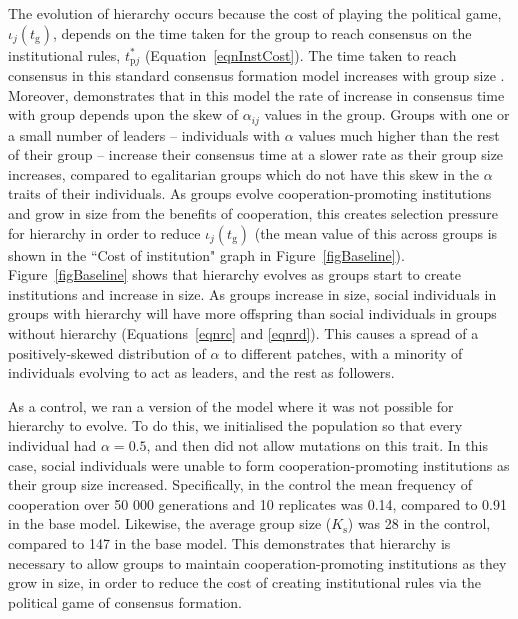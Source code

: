 \documentclass{rstb}
\begin{document}
\begin{linenumbers}
 The evolution of hierarchy occurs because the cost of playing the political game, $\iota_j(t_\mathrm{g})$, depends on the time taken for the group to reach consensus on the institutional rules, $t_{\mathrm{p}j}^*$ (Equation~\ref{eqnInstCost}). The time taken to reach consensus in this standard consensus formation model increases with group size \cite{Perret:2020:a}. Moreover, \cite{Perret:2020:a} demonstrates that in this model the rate of increase in consensus time with group depends upon the skew of $\alpha_{ij}$ values in the group. Groups with one or a small number of leaders -- individuals with $\alpha$ values much higher than the rest of their group -- increase their consensus time at a slower rate as their group size increases, compared to egalitarian groups which do not have this skew in the $\alpha$ traits of their individuals. As groups evolve cooperation-promoting institutions and grow in size from the benefits of cooperation, this creates selection pressure for hierarchy in order to reduce $\iota_j(t_\mathrm{g})$ (the mean value of this across groups is shown in the ``Cost of institution" graph in Figure~\ref{figBaseline}). Figure~\ref{figBaseline} shows that hierarchy evolves as groups start to create institutions and increase in size. As groups increase in size, social individuals in groups with hierarchy will have more offspring than social individuals in groups without hierarchy (Equations~\ref{eqnrc} and \ref{eqnrd}). This causes a spread of a positively-skewed distribution of $\alpha$ to different patches, with a minority of individuals evolving to act as leaders, and the rest as followers.

 As a control, we ran a version of the model where it was not possible for hierarchy to evolve. To do this, we initialised the population so that every individual had $\alpha=0.5$, and then did not allow mutations on this trait. In this case, social individuals were unable to form cooperation-promoting institutions as their group size increased. Specifically, in the control the mean frequency of cooperation over 50 000 generations and 10 replicates was 0.14, compared to 0.91 in the base model. Likewise, the average group size ($K_\mathrm{s}$) was 28 in the control, compared to 147 in the base model. This demonstrates that hierarchy is necessary to allow groups to maintain cooperation-promoting institutions as they grow in size, in order to reduce the cost of creating institutional rules via the political game of consensus formation. 


\end{linenumbers}
\end{document}
